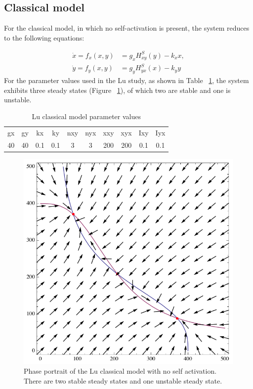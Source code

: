 \clearpage

\subsection{Classical model}
For the classical model, in which no self-activation is present, the system reduces to the following equations:

\begin{align}
\dot{x}=f_{x}(x,y) &= g_{x}H^{S}_{xy}(y)-k_{x}x,\label{eq:lu_cl_1}\\
\dot{y}=f_{y}(x,y) &= g_{y}H^{S}_{yx}(x)-k_{y}y\label{eq:lu_cl_2}
\end{align}
For the parameter values used in the Lu study, as shown in Table ~\ref{tab:lu_cl_bi}, the system exhibits three steady states (Figure ~\ref{fig:lu_bis_class}), of which two are stable and one is unstable. 

\begin{table}[htbp]
\centering
\caption{Lu classical model parameter values}
\label{tab:lu_cl_bi}
\begin{tabular}{cccccccccc}
gx    & gy    & kx    & ky    & nxy & nyx & xxy     & xyx     & Ixy   & Iyx \\
40&40     &0.1   & 0.1   &  3  &  3  &  200    &  200    & 0.1    &   0.1
\end{tabular}
\end{table}

\begin{figure}[htbp]
\centering
\includegraphics[scale=0.4]{chapterStabilityFinder/Lu_switches/images/mae/classical_bistable.png}
\caption[Phase portrait of the Lu classical model with no self activation]{Phase portrait of the Lu classical model with no self activation. There are two stable steady states and one unstable steady state.}
\label{fig:lu_bis_class}
\end{figure}


